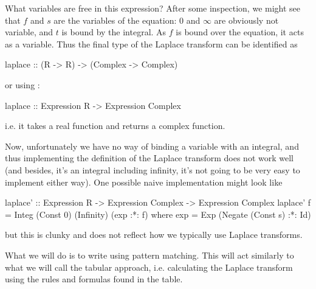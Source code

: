 \begin{newtext}
What variables are free in this expression? After some inspection, we might see that $f$ and $s$ are the variables of the equation: $0$ and $\infty$ are obviously not variable, and $t$ is bound by the integral. As $f$ is bound over the equation, it acts as a variable. Thus the final type of the Laplace transform can be identified as 
\begin{code'}
laplace :: (R -> R) -> (Complex -> Complex)
\end{code'} 
or using : 
\begin{code'}
laplace :: Expression R -> Expression Complex 
\end{code'} 
i.e. it takes a real function and returns a complex function. 

Now, unfortunately we have no way of binding a variable with an integral, and thus implementing the definition of the Laplace transform does not work well (and besides, it's an integral including infinity, it's not going to be very easy to implement either way). One possible naive implementation might look like
\end{newtext}
\begin{code'}
laplace' :: Expression R -> Expression Complex -> Expression Complex
laplace' f = Integ (Const 0) (Infinity) (exp :*: f) 
               where exp = Exp (Negate (Const s) :*: Id) 
\end{code'}
\begin{newtext}
but this is clunky and does not reflect how we typically use Laplace transforms. 

What we will do is to write  using pattern matching. This will act similarly to what we will call the tabular approach, i.e. calculating the Laplace transform using the rules and formulas found in the table. 
\end{newtext}



